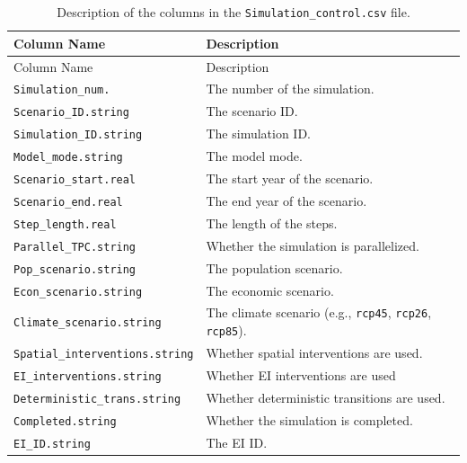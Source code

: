 \documentclass[
  letterpaper,
  DIV=11,
  numbers=noendperiod]{scrreprt}
\begin{document}
\begin{longtable}[]{@{}
  >{\raggedright\arraybackslash}p{}
  >{\raggedright\arraybackslash}p{}@{}}
\caption{Description of the columns in the
\texttt{Simulation\_control.csv} file.
}\label{tbl-simulation-control}\tabularnewline
\toprule\noalign{}
\begin{minipage}[b]{\linewidth}\raggedright
Column Name
\end{minipage} & \begin{minipage}[b]{\linewidth}\raggedright
Description
\end{minipage} \\
\midrule\noalign{}
\endfirsthead
\toprule\noalign{}
\begin{minipage}[b]{\linewidth}\raggedright
Column Name
\end{minipage} & \begin{minipage}[b]{\linewidth}\raggedright
Description
\end{minipage} \\
\midrule\noalign{}
\endhead
\bottomrule\noalign{}
\endlastfoot
\texttt{Simulation\_num.} & The number of the simulation. \\
\texttt{Scenario\_ID.string} & The scenario ID. \\
\texttt{Simulation\_ID.string} & The simulation ID. \\
\texttt{Model\_mode.string} & The model mode. \\
\texttt{Scenario\_start.real} & The start year of the scenario. \\
\texttt{Scenario\_end.real} & The end year of the scenario. \\
\texttt{Step\_length.real} & The length of the steps. \\
\texttt{Parallel\_TPC.string} & Whether the simulation is
parallelized. \\
\texttt{Pop\_scenario.string} & The population scenario. \\
\texttt{Econ\_scenario.string} & The economic scenario. \\
\texttt{Climate\_scenario.string} & The climate scenario (e.g.,
\texttt{rcp45}, \texttt{rcp26}, \texttt{rcp85}). \\
\texttt{Spatial\_interventions.string} & Whether spatial interventions
are used. \\
\texttt{EI\_interventions.string} & Whether EI interventions are used \\
\texttt{Deterministic\_trans.string} & Whether deterministic transitions
are used. \\
\texttt{Completed.string} & Whether the simulation is completed. \\
\texttt{EI\_ID.string} & The EI ID. \\
\end{longtable}
\end{document}
